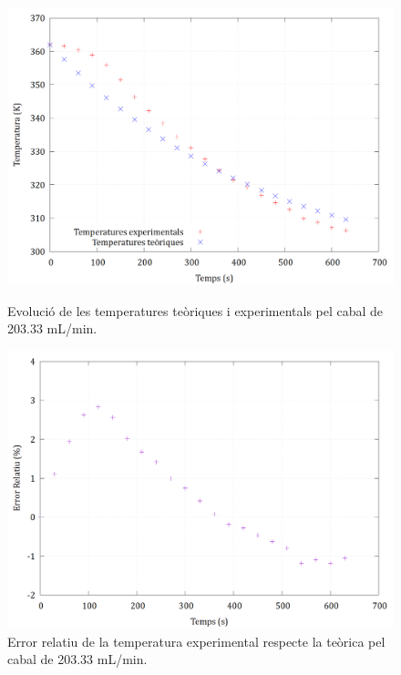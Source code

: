 \documentclass[10pt, twoside]{article}
\begin{document}
\begin{figure}[h!]
    \centering
    \begin{minipage}{0.45\linewidth}
        \centering
        \includegraphics[width=\linewidth]{203.png}
        \caption{Evolució de les temperatures teòriques i experimentals pel cabal de 203.33 mL/min.}
    \end{minipage}
    \hspace{0.05\linewidth}
    \begin{minipage}{0.45\linewidth}
        \centering
        \includegraphics[width=\linewidth]{203error.png}
        \caption{Error relatiu de la temperatura experimental respecte la teòrica pel cabal de 203.33 mL/min.}
    \end{minipage}
\end{figure}
\end{document}
